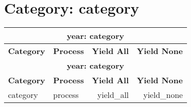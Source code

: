 \documentclass{article}
\begin{document}
\section*{Category: category}
\begin{longtable}[c]{|l|l|r|r|}
\hline
\multicolumn{4}{|c|}{\textbf{year: category}} \\
\hline
\textbf{Category} & \textbf{Process} & \textbf{Yield All} & \textbf{Yield None} \\
\hline
\endfirsthead
\hline
\multicolumn{4}{|c|}{\textbf{year: category}} \\
\hline
\textbf{Category} & \textbf{Process} & \textbf{Yield All} & \textbf{Yield None} \\
\hline
\endhead
category & process & yield_all & yield_none \\
\hline
\end{longtable}
\end{document}
